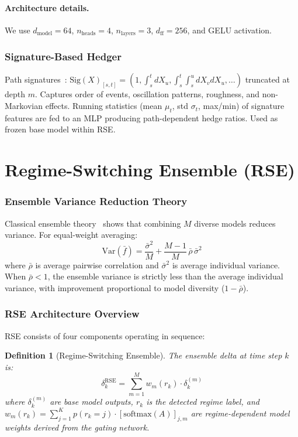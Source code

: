 \documentclass[11pt,oneside]{report}
\newtheorem{definition}{Definition}[chapter]
\begin{document}
\paragraph{Architecture details.}
We use $d_{\text{model}} = 64$, $n_{\text{heads}} = 4$, $n_{\text{layers}} = 3$, $d_{\text{ff}} = 256$, and GELU activation.

\subsubsection{Signature-Based Hedger}

Path signatures~\citep{lyons1998differential}: $\mathrm{Sig}(X)_{[s,t]} = (1, \int_s^t dX_u, \int_s^t\int_s^u dX_v dX_u, \ldots)$ truncated at depth $m$. Captures order of events, oscillation patterns, roughness, and non-Markovian effects. Running statistics (mean $\mu_t$, std $\sigma_t$, max/min) of signature features are fed to an MLP producing path-dependent hedge ratios. Used as frozen base model within RSE.

\section{Regime-Switching Ensemble (RSE)}
\label{sec:rse}

\subsubsection{Ensemble Variance Reduction Theory}

Classical ensemble theory~\citep{dietterich2000ensemble} shows that combining $M$ diverse models reduces variance. For equal-weight averaging:
\begin{equation}
    \mathrm{Var}(\bar{f}) = \frac{\bar\sigma^2}{M} + \frac{M-1}{M}\,\bar\rho\,\bar\sigma^2
    \label{eq:ensemble_classical}
\end{equation}
where $\bar{\rho}$ is average pairwise correlation and $\bar\sigma^2$ is average individual variance. When $\bar\rho < 1$, the ensemble variance is strictly less than the average individual variance, with improvement proportional to model diversity ($1-\bar\rho$).

\subsubsection{RSE Architecture Overview}

RSE consists of four components operating in sequence:

\begin{definition}[Regime-Switching Ensemble]
The ensemble delta at time step $k$ is:
\begin{equation}
    \delta_k^{\mathrm{RSE}} = \sum_{m=1}^{M} w_m(r_k) \cdot \delta_k^{(m)}
    \label{eq:rse}
\end{equation}
where $\delta_k^{(m)}$ are base model outputs, $r_k$ is the detected regime label, and $w_m(r_k) = \sum_{j=1}^K p(r_k = j) \cdot [\mathrm{softmax}(A)]_{j,m}$ are regime-dependent model weights derived from the gating network.
\end{definition}
\end{document}
